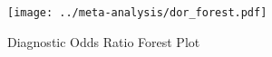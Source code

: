 \begin{figure}[p]
\centering

\texttt{[image: ../meta-analysis/dor\_forest.pdf]}

\caption[Diagnostic Odds Ratio Forest Plot]{Diagnostic Odds Ratio Forest Plot}
\label{fig:dor_forest}
\end{figure}
